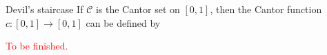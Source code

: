 
\begin{exmp}{Devil's staircase}{}
	If \(\mathcal{C}\) is the Cantor set on \([0,1]\), then the Cantor function \(c : [0,1] \to [0,1]\) can be defined by

	\textcolor{red}{To be finished.}
\end{exmp}
